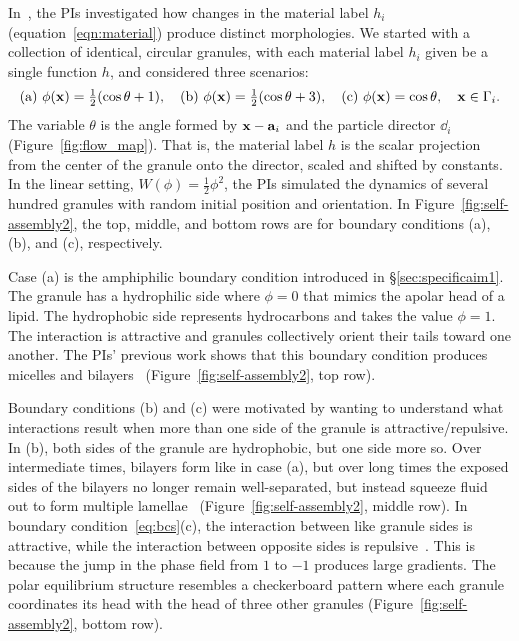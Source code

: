 In~\cite{fu-ryh-qua-you2022}, the PIs investigated how changes in the
material label $h_i$ (equation~\eqref{eqn:material}) produce distinct
morphologies. We started with a collection of identical, circular
granules, with each material label $h_i$ given be a single function $h$,
and considered three scenarios:
\begin{equation}
  \label{eq:bcs}
   \text{(a) }  \phi(\mathbf{x}) = \tfrac{1}{2}(\cos \theta + 1),\quad
   \text{(b)  } \phi(\mathbf{x}) = \tfrac{1}{2}(\cos \theta + 3),\quad
   \text{(c) }  \phi(\mathbf{x}) = \cos \theta, \quad \mathbf{x} \in \Gamma_i.
\end{equation}
The variable $\theta$ is the angle formed by $\mathbf{x}-\mathbf{a}_i$ and the
particle director $\dd_i$ (Figure~\ref{fig:flow_map}). That is, the
material label $h$ is the scalar projection from the center of the
granule onto the director, scaled and shifted by constants. In the
linear setting, $W(\phi) = \tfrac{1}{2}\phi^2$, the PIs simulated the
dynamics of several hundred granules with random initial position and
orientation. In Figure~\ref{fig:self-assembly2}, the top, middle, and
bottom rows are for boundary conditions (a), (b), and (c), respectively. 

Case (a) is the amphiphilic boundary condition introduced in
\S\ref{sec:specificaim1}. The granule has a hydrophilic side where $\phi
= 0$ that mimics the apolar head of a lipid. The hydrophobic side
represents hydrocarbons and takes the value $\phi = 1$. The interaction
is attractive and granules collectively orient their tails toward one
another. The PIs' previous work shows that this boundary condition
produces micelles and bilayers~\cite{Fu2018_SIAM}
(Figure~\ref{fig:self-assembly2}, top row).

Boundary conditions (b) and (c) were motivated by wanting to understand
what interactions result when more than one side of the granule is
attractive/repulsive. In (b), both sides of the granule are hydrophobic,
but one side more so. Over intermediate times, bilayers form like in
case (a), but over long times the exposed sides of the bilayers no
longer remain well-separated, but instead squeeze fluid out to form
multiple lamellae~\cite{Huetal19, deMeetal21}
(Figure~\ref{fig:self-assembly2}, middle row). In boundary
condition~\eqref{eq:bcs}(c), the interaction between like granule sides
is attractive, while the interaction between opposite sides is
repulsive~\cite{MaRa76, Ma77}. This is because the jump in the phase
field from $1$ to $-1$ produces large gradients. The polar equilibrium
structure resembles a checkerboard pattern where each granule
coordinates its head with the head of three other granules
(Figure~\ref{fig:self-assembly2}, bottom row).

